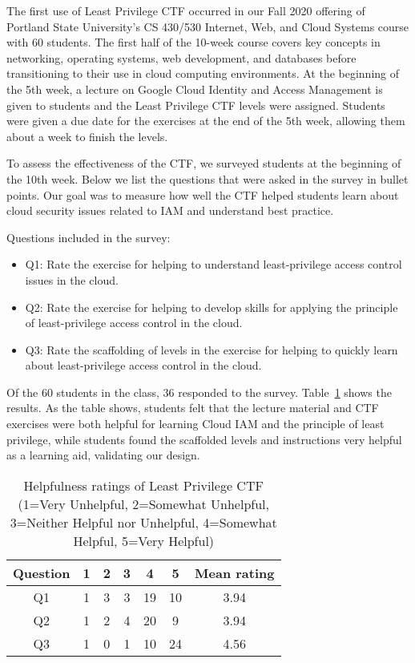 The first use of Least Privilege CTF occurred in our Fall 2020 offering of Portland State University's CS 430/530 Internet, Web, and Cloud Systems course with 60 students.  The first half of the 10-week course covers key concepts in networking, operating systems, web development, and databases before transitioning to their use in cloud computing environments. At the beginning of the 5th week, a lecture on Google Cloud Identity and Access Management is given to students and the Least Privilege CTF levels were assigned. Students were given a due date for the exercises at the end of the 5th week, allowing them about a week to finish the levels.

To assess the effectiveness of the CTF, we surveyed students at the beginning of the 10th week. Below we list the questions that were asked in the survey in bullet points.  Our goal was to measure how well the CTF helped students learn about cloud security issues related to IAM and understand best practice.  

Questions included in the survey:
\begin{itemize}
\item Q1: Rate the exercise for helping to understand least-privilege access control issues in the cloud.
\item Q2: Rate the exercise for helping to develop skills for applying the principle of least-privilege access control in the cloud.
\item Q3: Rate the scaffolding of levels in the exercise for helping to quickly learn about least-privilege access control in the cloud.
\end{itemize}

Of the 60 students in the class, 36 responded to the survey.  Table~\ref{table:data} shows the results. As the table shows, students felt that the lecture material and CTF exercises were both helpful for learning Cloud IAM and the principle of least privilege, while students found the scaffolded levels and instructions very helpful as a learning aid, validating our design.

\begin{table}[h]
 \vspace{-0.20cm}
 \caption{Helpfulness ratings of Least Privilege CTF (1=Very Unhelpful, 2=Somewhat Unhelpful, 3=Neither Helpful nor Unhelpful, 4=Somewhat Helpful, 5=Very Helpful)}
    \label{table:data} \centering
    \begin{tabular}{|c|c|c|c|c|c|c|}
    \hline
    Question & 1 & 2 & 3 & 4 & 5 &Mean rating\\
    \hline
    \hline
    Q1 & 1 & 3 & 3 & 19 & 10 & 3.94\\ %
    \hline
    Q2 & 1 & 2 & 4 & 20 & 9 & 3.94\\ %
    \hline
    Q3 & 1 & 0 & 1 & 10 & 24 & 4.56\\ %
    \hline
    \end{tabular}
\end{table}
